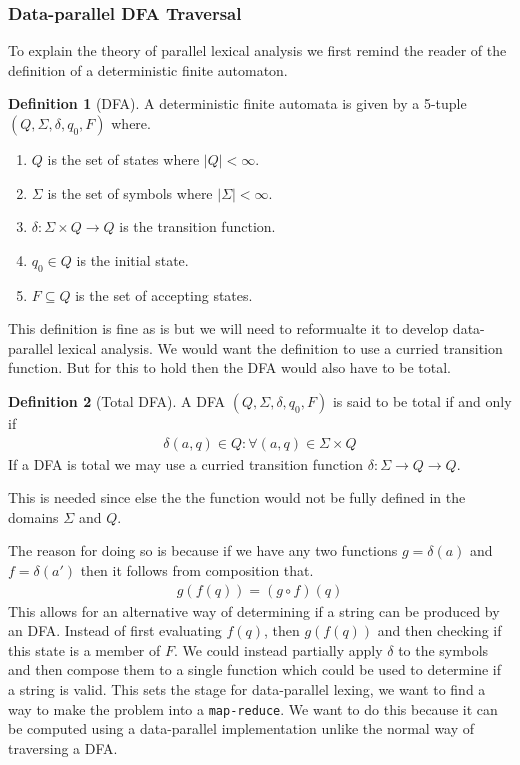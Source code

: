 \documentclass[a4paper,12pt]{article}
\theoremstyle{definition}
\newtheorem{definition}{Definition}[section]
\begin{document}
\subsubsection{Data-parallel DFA Traversal}
To explain the theory of parallel lexical analysis we first remind the reader of the definition of a deterministic finite automaton.
\begin{definition}[DFA]
  A deterministic finite automata \cite{10.5555/1196416} \cite{enwiki:1192025610} is given by a 5-tuple $(Q, \Sigma, \delta, q_0, F)$ where.
  \begin{enumerate}
    \item $Q$ is the set of states where $|Q| < \infty$.
    \item $\Sigma$ is the set of symbols where $|\Sigma| < \infty$.
    \item $\delta: \Sigma \times Q \to Q$ is the transition function.
    \item $q_0 \in Q$ is the initial state.
    \item $F\subseteq Q$ is the set of accepting states.
  \end{enumerate}
\end{definition}
\noindent This definition is fine as is but we will need to reformualte it to develop data-parallel lexical analysis. We would want the definition to use a curried transition function. But for this to hold then the DFA would also have to be total.
\begin{definition}[Total DFA]
  A DFA $(Q, \Sigma, \delta, q_0, F)$ is said to be total if and only if
  \begin{align*}
    \delta(a, q) \in Q : \forall (a, q) \in \Sigma \times Q
  \end{align*}
  If a DFA is total we may use a curried transition function $\delta: \Sigma \to Q \to Q$.
\end{definition}
\noindent This is needed since else the the function would not be fully defined in the domains $\Sigma$ and $Q$.

The reason for doing so is because if we have any two functions $g = \delta(a)$ and $f = \delta(a')$ then it follows from composition that.
\begin{align*}
  g(f(q)) = (g \circ f) (q)
\end{align*}
This allows for an alternative way of determining if a string can be produced by an DFA. Instead of first evaluating $f(q)$, then $g(f(q))$ and then checking if this state is a member of $F$. We could instead partially apply $\delta$ to the symbols and then compose them to a single function which could be used to determine if a string is valid. This sets the stage for data-parallel lexing, we want to find a way to make the problem into a \texttt{map-reduce}. We want to do this because it can be computed using a data-parallel implementation unlike the normal way of traversing a DFA.
\end{document}
